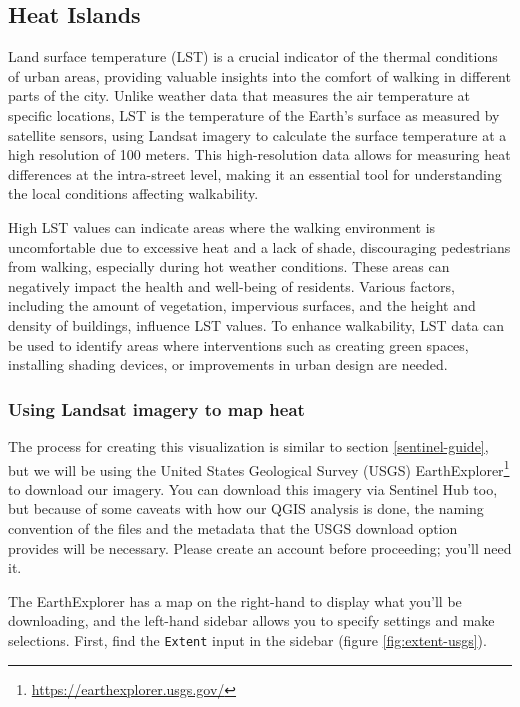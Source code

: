\documentclass[
]{latex/krantz}
\renewcommand{\href}[2]{#2\footnote{\url{#1}}}
\DeclareRobustCommand{\href}[2]{#2\footnote{\url{#1}}}
\begin{document}
\hypertarget{heat-islands}{%
\subsection{Heat Islands}\label{heat-islands}}

Land surface temperature (LST) is a crucial indicator of the thermal conditions of urban areas, providing valuable insights into the comfort of walking in different parts of the city. Unlike weather data that measures the air temperature at specific locations, LST is the temperature of the Earth's surface as measured by satellite sensors, using Landsat imagery to calculate the surface temperature at a high resolution of 100 meters. This high-resolution data allows for measuring heat differences at the intra-street level, making it an essential tool for understanding the local conditions affecting walkability.

High LST values can indicate areas where the walking environment is uncomfortable due to excessive heat and a lack of shade, discouraging pedestrians from walking, especially during hot weather conditions. These areas can negatively impact the health and well-being of residents. Various factors, including the amount of vegetation, impervious surfaces, and the height and density of buildings, influence LST values. To enhance walkability, LST data can be used to identify areas where interventions such as creating green spaces, installing shading devices, or improvements in urban design are needed.

\hypertarget{using-landsat-imagery-to-map-heat}{%
\subsubsection{Using Landsat imagery to map heat}\label{using-landsat-imagery-to-map-heat}}

The process for creating this visualization is similar to section \ref{sentinel-guide}, but we will be using the United States Geological Survey (USGS) \href{https://earthexplorer.usgs.gov/}{EarthExplorer} to download our imagery. You can download this imagery via Sentinel Hub too, but because of some caveats with how our QGIS analysis is done, the naming convention of the files and the metadata that the USGS download option provides will be necessary. Please create an account before proceeding; you'll need it.

The EarthExplorer has a map on the right-hand to display what you'll be downloading, and the left-hand sidebar allows you to specify settings and make selections. First, find the \texttt{Extent} input in the sidebar (figure \ref{fig:extent-usgs}).
\end{document}
